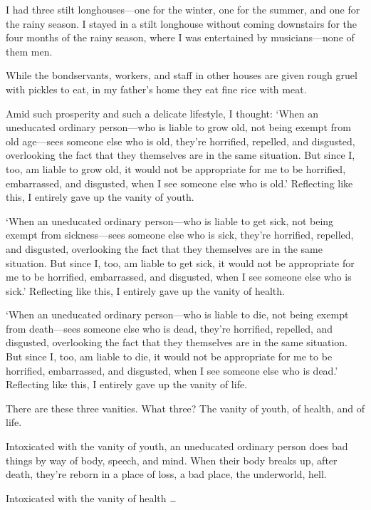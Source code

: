 \documentclass[12pt,openany]{book}%
\begin{document}
I had three stilt longhouses—one for the winter, one for the summer, and one for the rainy season. I stayed in a stilt longhouse without coming downstairs for the four months of the rainy season, where I was entertained by musicians—none of them men. 

While the bondservants, workers, and staff in other houses are given rough gruel with pickles to eat, in my father’s home they eat fine rice with meat. 

Amid such prosperity and such a delicate lifestyle, I thought: ‘When an uneducated ordinary person—who is liable to grow old, not being exempt from old age—sees someone else who is old, they’re horrified, repelled, and disgusted, overlooking the fact that they themselves are in the same situation. But since I, too, am liable to grow old, it would not be appropriate for me to be horrified, embarrassed, and disgusted, when I see someone else who is old.’ Reflecting like this, I entirely gave up the vanity of youth. 

‘When an uneducated ordinary person—who is liable to get sick, not being exempt from sickness—sees someone else who is sick, they’re horrified, repelled, and disgusted, overlooking the fact that they themselves are in the same situation. But since I, too, am liable to get sick, it would not be appropriate for me to be horrified, embarrassed, and disgusted, when I see someone else who is sick.’ Reflecting like this, I entirely gave up the vanity of health. 

‘When an uneducated ordinary person—who is liable to die, not being exempt from death—sees someone else who is dead, they’re horrified, repelled, and disgusted, overlooking the fact that they themselves are in the same situation. But since I, too, am liable to die, it would not be appropriate for me to be horrified, embarrassed, and disgusted, when I see someone else who is dead.’ Reflecting like this, I entirely gave up the vanity of life. 

There are these three vanities. What three? The vanity of youth, of health, and of life. 

Intoxicated with the vanity of youth, an uneducated ordinary person does bad things by way of body, speech, and mind. When their body breaks up, after death, they’re reborn in a place of loss, a bad place, the underworld, hell. 

Intoxicated with the vanity of health … 
\end{document}
